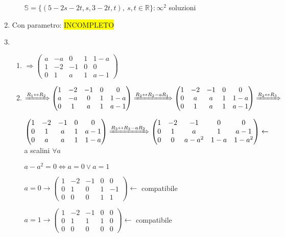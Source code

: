 \documentclass{article}
\newcommand{\hl}[1]{\colorbox{yellow}{#1}}
\newcommand{\R}{\mathbb{R}}
\begin{document}
\begin{enumerate}
\begin{enumerate}
		    $\mathbb{S}=\{(5-2s-2t,s,3-2t,t),\ s,t\in\R\}:\infty^2$ soluzioni
	  \end{enumerate}
	\item Con parametro: \hl{INCOMPLETO}
	\item \begin{enumerate}
		\item $\Rightarrow\begin{pmatrix}
				a & -a & 0  & 1 & 1-a \\
				1 & -2 & -1 & 0 & 0   \\
				0 & 1  & a  & 1 & a-1
			\end{pmatrix}$
		\item $\xRightarrow{R_1\leftrightarrow R_2}
			\begin{pmatrix}
				1 & -2 & -1 & 0 & 0   \\
				a & -a & 0  & 1 & 1-a \\
				0 & 1  & a  & 1 & a-1
			\end{pmatrix}\xRightarrow{R_2\leftrightarrow R_2-aR_1}
			\begin{pmatrix}
				1 & -2 & -1 & 0 & 0   \\
				0 & a  & a  & 1 & 1-a \\
				0 & 1  & a  & 1 & a-1
			\end{pmatrix}\xRightarrow{R_2\leftrightarrow R_3}$

		  $\begin{pmatrix}
				1 & -2 & -1 & 0 & 0   \\
				0 & 1  & a  & 1 & a-1 \\
				0 & a  & a  & 1 & 1-a
			\end{pmatrix}\xRightarrow{R_3\leftrightarrow R_3-aR_2}
			\begin{pmatrix}
				1 & -2 & -1    & 0   & 0     \\
				0 & 1  & a     & 1   & a-1   \\
				0 & 0  & a-a^2 & 1-a & 1-a^2
			\end{pmatrix}\leftarrow$ a scalini $\forall a$

		  $a-a^2=0\Leftrightarrow a=0\vee a=1$

		  $a=0\rightarrow
			\begin{pmatrix}
				1 & -2 & -1 & 0 & 0  \\
				0 & 1  & 0  & 1 & -1 \\
				0 & 0  & 0  & 1 & 1
			\end{pmatrix}\leftarrow$ compatibile

		  $a=1\rightarrow
			\begin{pmatrix}
				1 & -2 & -1 & 0 & 0 \\
				0 & 1  & 1  & 1 & 0 \\
				0 & 0  & 0  & 0 & 0
			\end{pmatrix}\leftarrow$ compatibile


\end{enumerate}
\end{enumerate}
\end{document}
